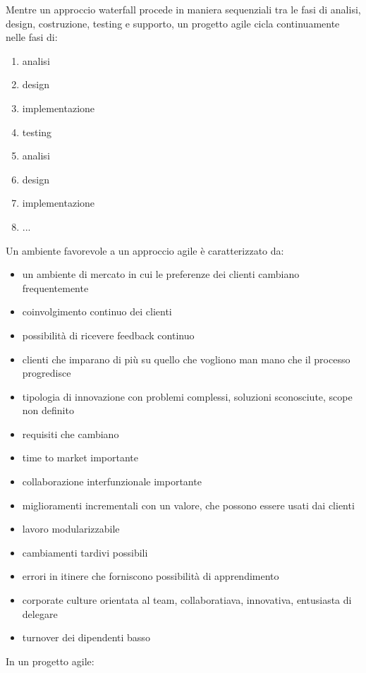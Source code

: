 \documentclass[answers, a4paper, 11pt]{exam}
\begin{document}
Mentre un approccio waterfall procede in maniera sequenziali tra le fasi di analisi, design, costruzione, testing e supporto, un progetto agile cicla continuamente nelle fasi di:

\begin{enumerate}
    \item analisi
    \item design
    \item implementazione
    \item testing
    \item analisi
    \item design
    \item implementazione
    \item ...
\end{enumerate}

Un ambiente favorevole a un approccio agile è caratterizzato da:

\begin{itemize}
    \item un ambiente di mercato in cui le preferenze dei clienti cambiano frequentemente
    \item coinvolgimento continuo dei clienti
    \item possibilità di ricevere feedback continuo
    \item clienti che imparano di più su quello che vogliono man mano che il processo progredisce
    \item tipologia di innovazione con problemi complessi, soluzioni sconosciute, scope non definito
    \item requisiti che cambiano
    \item time to market importante
    \item collaborazione interfunzionale importante
    \item miglioramenti incrementali con un valore, che possono essere usati dai clienti
    \item lavoro modularizzabile
    \item cambiamenti tardivi possibili
    \item errori in itinere che forniscono possibilità di apprendimento
    \item corporate culture orientata al team, collaboratiava, innovativa, entusiasta di delegare
    \item turnover dei dipendenti basso
\end{itemize}


In un progetto agile: 
\end{document}
